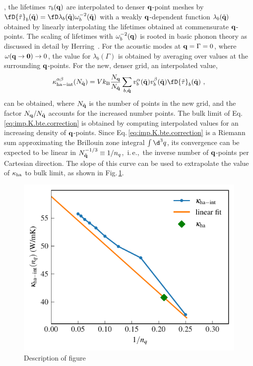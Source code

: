 , the lifetimes $\tau_b ({\bf q})$ are interpolated to denser $\bf q$-point meshes by $\fD{\tilde{\tau}}_b (\tilde{\bf q}) = \fD \lambda_b (\tilde {\bf q}) \omega_b^{-2} (\tilde {\bf q})$ with a weakly $\bf q$-dependent function $\lambda_b (\tilde {\bf q})$ obtained by linearly interpolating the lifetimes obtained at commensurate $\bf q$-points. The scaling of lifetimes with $\omega_b^{-2} ({\bf q})$ is rooted in basic phonon theory as discussed in detail by Herring~\cite{Herring1954}. For the acoustic modes at ${\bf q} = \Gamma = 0$, where $\omega ({\bf q \to 0}) \to 0$, the value for $\lambda_b (\Gamma)$ is obtained by averaging over values at the surrounding $\bf q$-points. For the new, denser grid, an interpolated value,
\begin{align}
	\kappa_{\rm ha - int}^{\alpha \beta} (N_{\tilde{\bf q}}) = V k_{\rm B} \frac{N_{\bf q}}{N_{\tilde{\bf q}}} \sum_{b, \tilde{\bf q}} v^\alpha_b (\tilde{\bf q}) v^{\beta}_b (\tilde{\bf q}) \fD{\tilde{\tau}}_b (\tilde{\bf q})~,
	\label{eq:imp.K.bte.correction}
\end{align}
can be obtained, where $N_{\tilde{\bf q}}$ is the number of points in the new grid, and the factor $N_{\bf q} / N_{\tilde{\bf q}}$ accounts for the increased number points. The bulk limit of Eq.\,\eqref{eq:imp.K.bte.correction} is obtained by computing interpolated values for an increasing density of $\bf q$-points. Since Eq.\,\eqref{eq:imp.K.bte.correction} is a Riemann sum approximating the Brillouin zone integral $\int \d^3 q$, its convergence can be expected to be linear in $N_{\tilde{\bf q}}^{-1/3} \equiv 1 / n_q$,~i.\,e.,~the inverse number of $\bf q$-points per Cartesian direction. The slope of this curve can be used to extrapolate the value of $\kappa_{\rm ha}$ to bulk limit, as shown in Fig.\,\ref{fig:imp.kappa.bte.correction}.
\begin{figure}
	\includegraphics[width=.8\textwidth]{./data/plots/lifetimes/greenkubo_summary_interpolation_fit.pdf}
	\caption{Description of figure}
	\label{fig:imp.kappa.bte.correction}
\end{figure}
